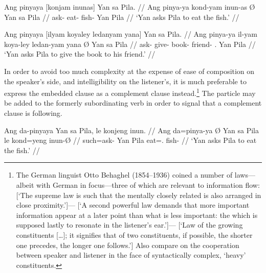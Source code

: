 \pex[*=\ques\ques]
\a\ljudge{\ques}\begingl
	\gla Ang pinyaya {\normalfont [}konjam inunas{\normalfont]} {} Yan sa 
		Pila. //
	\glb Ang pinya-ya kond-yam inun-as Ø Yan sa Pila //
	\glc \AgtT{} ask-\TsgM{} eat-\Ptcp{} fish-\Parg{} \Top{} Yan \Parg{} 
		Pila //
	\glft `Yan asks Pila to eat the fish.' //
\endgl

\a\ljudge{\ques\ques}\begingl
	\gla Ang pinyaya {\normalfont [}ilyam koyaley ledanyam 
		yana{\normalfont]} {} Yan sa Pila. //
	\glb Ang pinya-ya il-yam koya-ley ledan-yam yana Ø Yan sa Pila //
	\glc \AgtT{} ask-\TsgM{} give-\Ptcp{} book-\PargI{} friend-\Dat{} 
		\TsgM{}.\Gen{} \Top{} Yan \Parg{} Pila //
	\glft `Yan asks Pila to give the book to his friend.' //
\endgl
\xe

In order to avoid too much complexity at the expense of ease of composition on
the speaker's side, and intelligibility on the listener's, it is much
preferable to express the embedded clause as a complement clause
instead.\footnote{The German linguist Otto Behaghel (1854--1936) coined a
number of laws---albeit with German in focus---three of which are relevant to
information flow:  [`The
supreme law is such that the mentally closely related is also arranged in close
proximity.']--- [`A second powerful law demands that more
important information appear at a later point than what is less important: the
which is supposed lastly to resonate in the listener's
ear.']--- [`Law of the growing constituents […]; it signifies that of
two constituents, if possible, the shorter one precedes, the longer one
follows.'] Also compare \citet{wasow1997} on the cooperation between speaker
and listener in the face of syntactically complex, `heavy' constituents.} The
particle  may be added to the formerly subordinating verb in
order to signal that a complement clause is following.

\pex
\a\begingl
	\gla Ang da-pinyaya {} Yan sa Pila, \normalfont{[}le konjeng 
		inun\normalfont{]}. //
	\glb Ang da=pinya-ya Ø Yan sa Pila le kond=yeng inun-Ø //
	\glc \AgtT{} such=ask-\TsgM{} \Top{} Yan \Parg{} Pila \PatTI{} 
		eat=\TsgF{}.\Aarg{} fish-\Top{} //
	\glft `Yan asks Pila to eat the fish.' //
\endgl

